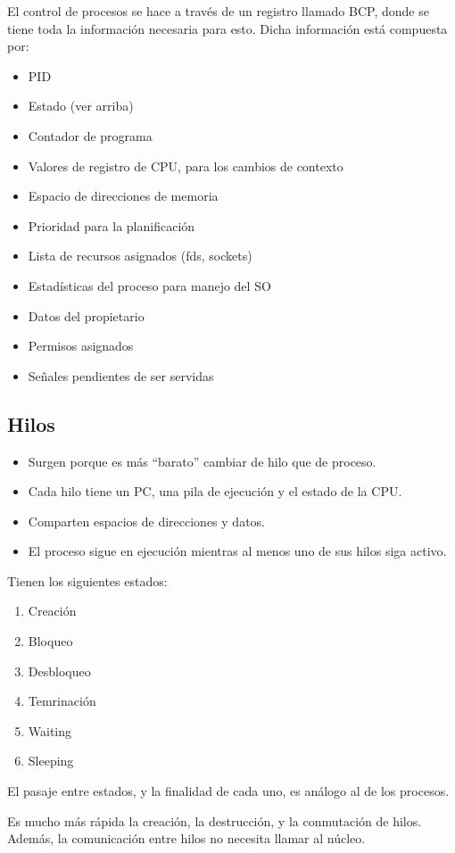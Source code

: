 El control de procesos se hace a través de un registro llamado BCP, donde se tiene toda la información necesaria para esto. Dicha información está compuesta por:
\begin{itemize}
  \item PID
  \item Estado (ver arriba)
  \item Contador de programa
  \item Valores de registro de CPU, para los cambios de contexto
  \item Espacio de direcciones de memoria
  \item Prioridad para la planificación
  \item Lista de recursos asignados (fds, sockets)
  \item Estadísticas del proceso para manejo del SO
  \item Datos del propietario
  \item Permisos asignados
  \item Señales pendientes de ser servidas
\end{itemize}

\subsection{Hilos}
\begin{itemize}
  \item Surgen porque es más ``barato'' cambiar de hilo que de proceso.
  \item Cada hilo tiene un PC, una pila de ejecución y el estado de la CPU. 
  \item Comparten espacios de direcciones y datos.
  \item El proceso sigue en ejecución mientras al menos uno de sus hilos siga activo.
\end{itemize}

Tienen los siguientes estados:
\begin{enumerate}
  \item Creación
  \item Bloqueo
  \item Desbloqueo
  \item Temrinación
  \item Waiting
  \item Sleeping
\end{enumerate}

El pasaje entre estados, y la finalidad de cada uno, es análogo al de los procesos.

Es mucho más rápida la creación, la destrucción, y la conmutación de hilos. Además, la comunicación entre hilos no necesita llamar al núcleo.
